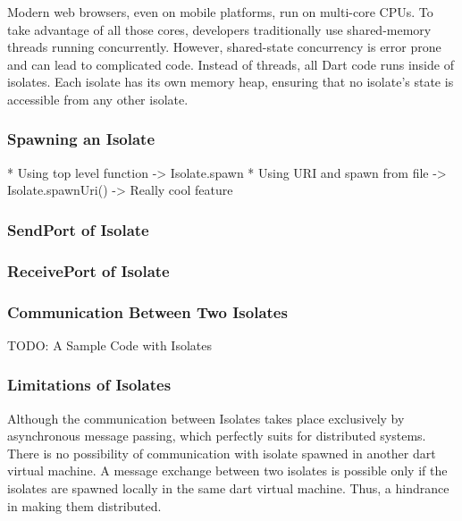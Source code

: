   Modern web browsers, even on mobile platforms, run on multi-core CPUs. To take advantage of all those cores, developers traditionally use shared-memory threads running concurrently. However, shared-state concurrency is error prone and can lead to complicated code.
  Instead of threads, all Dart code runs inside of isolates. Each isolate has its own memory heap, ensuring that no isolate’s state is accessible from any other isolate. ~\parencite{laddWalrath}

  \subsubsection{Spawning an Isolate}
  * Using top level function -> Isolate.spawn
  * Using URI and spawn from file -> Isolate.spawnUri()
    -> Really cool feature

  \subsubsection{SendPort of Isolate}
  \subsubsection{ReceivePort of Isolate}
  \subsubsection{Communication Between Two Isolates}
  TODO: A Sample Code with Isolates

  \subsubsection{Limitations of Isolates}
  Although the communication between Isolates takes place exclusively by asynchronous message passing, which perfectly suits for distributed systems. There is no possibility of communication with isolate spawned in another dart virtual machine. A message exchange between two isolates is possible only if the isolates are spawned locally in the same dart virtual machine. Thus, a hindrance in making them distributed.

